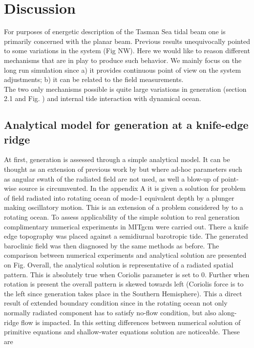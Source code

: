 \documentclass[12pt]{article}
\begin{document}
\newpage
\section{Discussion}
For purposes of energetic description of the Tasman Sea tidal beam one is primarily concerned 
with the planar beam. Previous results unequivocally pointed to some variations in the system (Fig 
NW). Here we would like to reason different mechanisms that are in play to produce such behavior. 
We mainly focus on the long run simulation since a) it provides continuous point of view on the 
system adjustments; b) it can be related to the field measurements.\\
The two only mechanisms possible is quite large variations in generation (section 2.1 and Fig. ) 
and internal tide interaction with dynamical ocean.
\subsection{Analytical model for generation at a knife-edge ridge}
At first, generation is assessed through a simple analytical model. It can be thought as an 
extension of previous work by \citep{rainville2010interference} but where ad-hoc parameters such as 
angular swath of the radiated 
field are not used, as well a blow-up of point-wise source is circumvented. In the appendix A it is 
given a solution for problem of field radiated into rotating ocean of mode-1 equivalent depth by a 
plunger making oscillatory motion. This is an extension of a problem considered by 
\citep{morse1946methods} to a rotating ocean. To assess applicability of the simple solution to 
real generation complimentary numerical experiments in MITgcm were carried out. There a knife edge 
topography was placed against a semidiurnal barotropic tide. The generated baroclinic field was 
then diagnosed by the same methods as before. The comparison between numerical experiments and 
analytical solution are presented on Fig. Overall, the analytical solution is representative of a 
radiated spatial pattern. This is absolutely true when Coriolis parameter is set to 0. Further when 
rotation is present the overall pattern is skewed towards left (Coriolis force is to the left since 
generation takes place in the Southern Hemisphere). This a direct result of extended boundary 
condition since in the rotating ocean not only normally radiated component has to satisfy no-flow 
condition, but also along-ridge flow is impacted. In this setting differences between numerical 
solution of primitive equations and shallow-water equations solution are noticeable. These are 
\end{document}
